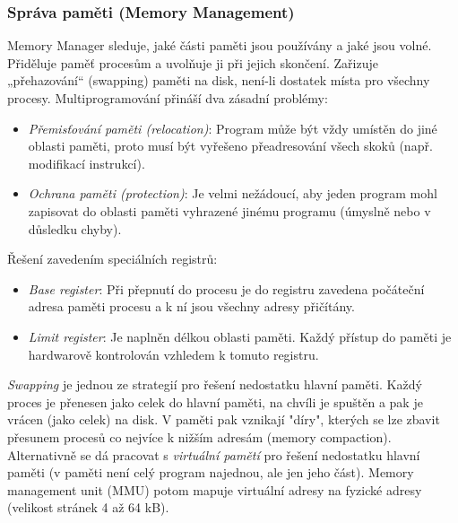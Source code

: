 \subsubsection*{Správa paměti (Memory Management)}
Memory Manager sleduje, jaké části paměti jsou používány a jaké jsou volné. Přiděluje paměť procesům a uvolňuje ji při jejich skončení. Zařizuje „přehazování“ (swapping) paměti na disk, není-li dostatek místa pro všechny procesy. Multiprogramování přináší dva zásadní problémy:
\begin{itemize}
\item \textit{Přemisťování paměti (relocation)}: Program může být vždy umístěn do jiné oblasti paměti, proto musí být vyřešeno přeadresování všech skoků (např. modifikací instrukcí).
\item \textit{Ochrana paměti (protection)}: Je velmi nežádoucí, aby jeden program mohl zapisovat do oblasti paměti vyhrazené jinému programu (úmyslně nebo v důsledku chyby).
\end{itemize}
Řešení zavedením speciálních registrů:
\begin{itemize}
\item \textit{Base register}: Při přepnutí do procesu je do registru zavedena počáteční adresa paměti procesu a k ní jsou všechny adresy přičítány.
\item \textit{Limit register}: Je naplněn délkou oblasti paměti. Každý přístup do paměti je hardwarově kontrolován vzhledem k tomuto registru.
\end{itemize}
\textit{Swapping} je jednou ze strategií pro řešení nedostatku hlavní paměti. Každý proces je přenesen jako celek do hlavní paměti, na chvíli je spuštěn a pak je vrácen (jako celek) na disk. V paměti pak vznikají "díry", kterých se lze zbavit přesunem procesů co nejvíce k nižším adresám (memory compaction).
Alternativně se dá pracovat s \textit{virtuální pamětí} pro řešení nedostatku hlavní paměti (v paměti není celý program najednou, ale jen jeho část). Memory management unit (MMU) potom mapuje virtuální adresy na fyzické adresy (velikost stránek 4 až 64 kB).

